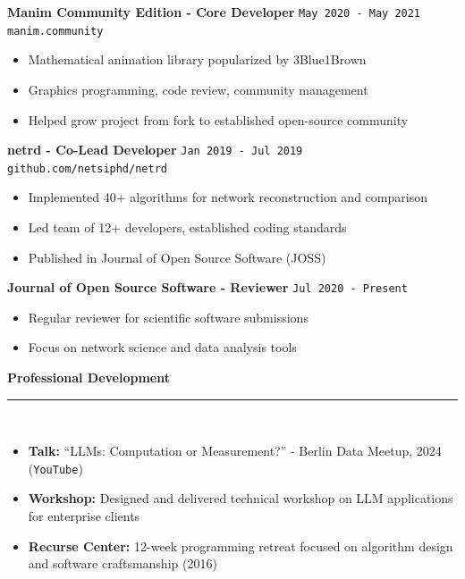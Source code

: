 \documentclass[11pt,a4paper]{article}
\newcommand{\sectiondivider}{%
    \vspace{2pt}\\%
    {\color{verdigris}\rule{30pt}{2pt}}\\%
    \vspace{8pt}%
}
\newcommand{\verdigrisbullet}{{\color{verdigris}$\bullet$}\space}
\newcommand{\jobduration}[1]{%
    \textcolor{mediumgray}{\texttt{\small #1}}%
}
\newcommand{\cvsectioncustom}[1]{%
    \vspace{12pt}%
    {\Large\color{navy}\textbf{#1}}%
    \sectiondivider%
}
\begin{document}
\vspace{6pt}

\textbf{\large\color{navy}Manim Community Edition - Core Developer} \hfill \jobduration{May 2020 - May 2021}\\
{\textcolor{verdigris}{\texttt{manim.community}}}

\begin{itemize}[leftmargin=15pt,itemsep=3pt]
    \item[\verdigrisbullet] Mathematical animation library popularized by 3Blue1Brown
    \item[\verdigrisbullet] Graphics programming, code review, community management
    \item[\verdigrisbullet] Helped grow project from fork to established open-source community
\end{itemize}

\vspace{6pt}

\textbf{\large\color{navy}netrd - Co-Lead Developer} \hfill \jobduration{Jan 2019 - Jul 2019}\\
{\textcolor{verdigris}{\texttt{github.com/netsiphd/netrd}}}

\begin{itemize}[leftmargin=15pt,itemsep=3pt]
    \item[\verdigrisbullet] Implemented 40+ algorithms for network reconstruction and comparison
    \item[\verdigrisbullet] Led team of 12+ developers, established coding standards
    \item[\verdigrisbullet] Published in Journal of Open Source Software (JOSS)
\end{itemize}

\vspace{6pt}

\textbf{\large\color{navy}Journal of Open Source Software - Reviewer} \hfill \jobduration{Jul 2020 - Present}

\begin{itemize}[leftmargin=15pt,itemsep=3pt]
    \item[\verdigrisbullet] Regular reviewer for scientific software submissions
    \item[\verdigrisbullet] Focus on network science and data analysis tools
\end{itemize}

\cvsectioncustom{Professional Development}

\begin{itemize}[leftmargin=15pt,itemsep=3pt]
    \item[\verdigrisbullet] \textbf{Talk:} ``LLMs: Computation or Measurement?'' - Berlin Data Meetup, 2024 ({\textcolor{verdigris}{\texttt{YouTube}}})
    \item[\verdigrisbullet] \textbf{Workshop:} Designed and delivered technical workshop on LLM applications for enterprise clients
    \item[\verdigrisbullet] \textbf{Recurse Center:} 12-week programming retreat focused on algorithm design and software craftsmanship (2016)
\end{itemize}
\end{document}

